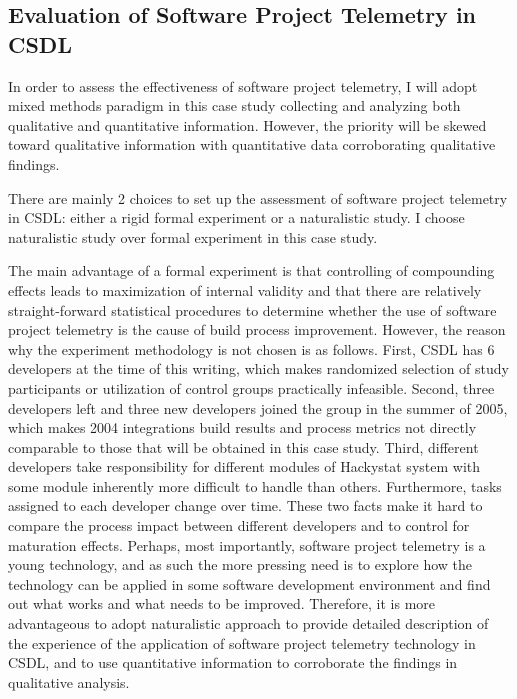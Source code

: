 \subsection{Evaluation of Software Project Telemetry in CSDL}  
\label{EvaluationInCSDL:Design:EvaluateTelemetry}

In order to assess the effectiveness of software project telemetry, I will adopt mixed methods paradigm in this case study collecting and analyzing both qualitative and quantitative information. However, the priority will be skewed toward qualitative information with quantitative data corroborating qualitative findings.

There are mainly 2 choices to set up the assessment of software project telemetry in CSDL: either a rigid formal experiment or a naturalistic study. I choose naturalistic study over formal experiment in this case study. 

The main advantage of a formal experiment is that controlling of compounding effects leads to maximization of internal validity and that there are relatively straight-forward statistical procedures to determine whether the use of software project telemetry is the cause of build process improvement. However, the reason why the experiment methodology is not chosen is as follows. First, CSDL has 6 developers at the time of this writing, which makes randomized selection of study participants or utilization of control groups practically infeasible. Second, three developers left and three new developers joined the group in the summer of 2005, which makes 2004 integrations build results and process metrics not directly comparable to those that will be obtained in this case study. Third, different developers take responsibility for different modules of Hackystat system with some module inherently more difficult to handle than others. Furthermore, tasks assigned to each developer change over time. These two facts make it hard to compare the process impact between different developers and to control for maturation effects. Perhaps, most importantly, software project telemetry is a young technology, and as such the more pressing need is to explore how the technology can be applied in some software development environment and find out what works and what needs to be improved. Therefore, it is more advantageous to adopt naturalistic approach to provide detailed description of the experience of the application of software project telemetry technology in CSDL, and to use quantitative information to corroborate the findings in qualitative analysis.

